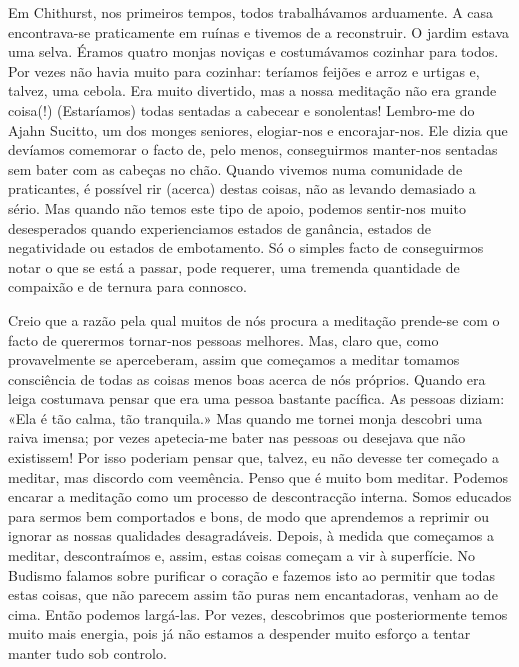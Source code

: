 Em Chithurst, nos primeiros tempos, todos trabalhávamos arduamente. A
casa encontrava-se praticamente em ruínas e tivemos de a reconstruir. O
jardim estava uma selva. Éramos quatro monjas noviças e costumávamos
cozinhar para todos. Por vezes não havia muito para cozinhar: teríamos
feijões e arroz e urtigas e, talvez, uma cebola. Era muito divertido,
mas a nossa meditação não era grande coisa(!) (Estaríamos) todas
sentadas a cabecear e sonolentas! Lembro-me do Ajahn Sucitto, um dos
monges seniores, elogiar-nos e encorajar-nos. Ele dizia que devíamos
comemorar o facto de, pelo menos, conseguirmos manter-nos sentadas sem
bater com as cabeças no chão. Quando vivemos numa comunidade de
praticantes, é possível rir (acerca) destas coisas, não as levando
demasiado a sério. Mas quando não temos este tipo de apoio, podemos
sentir-nos muito desesperados quando experienciamos estados de ganância,
estados de negatividade ou estados de embotamento. Só o simples facto de
conseguirmos notar o que se está a passar, pode requerer, uma tremenda
quantidade de compaixão e de ternura para connosco.

Creio que a razão pela qual muitos de nós procura a meditação prende-se
com o facto de querermos tornar-nos pessoas melhores. Mas, claro que,
como provavelmente se aperceberam, assim que começamos a meditar tomamos
consciência de todas as coisas menos boas acerca de nós próprios. Quando
era leiga costumava pensar que era uma pessoa bastante pacífica. As
pessoas diziam: «Ela é tão calma, tão tranquila.» Mas quando me tornei
monja descobri uma raiva imensa; por vezes apetecia-me bater nas pessoas
ou desejava que não existissem! Por isso poderiam pensar que, talvez, eu
não devesse ter começado a meditar, mas discordo com veemência. Penso
que é muito bom meditar. Podemos encarar a meditação como um processo de
descontracção interna. Somos educados para sermos bem comportados e
bons, de modo que aprendemos a reprimir ou ignorar as nossas qualidades
desagradáveis. Depois, à medida que começamos a meditar, descontraímos
e, assim, estas coisas começam a vir à superfície. No Budismo falamos
sobre purificar o coração e fazemos isto ao permitir que todas estas
coisas, que não parecem assim tão puras nem encantadoras, venham ao de
cima. Então podemos largá-las. Por vezes, descobrimos que posteriormente
temos muito mais energia, pois já não estamos a despender muito esforço
a tentar manter tudo sob controlo.

